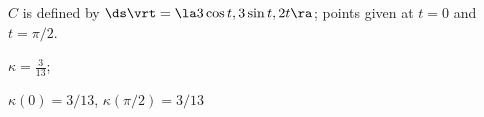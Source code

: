 {$C$ is defined by $\ds \vrt = \la 3\cos t,3\sin t, 2t\ra $; points given at $t=0$ and $t=\pi/2$. 
}
{$\kappa = \frac{3}{13}$;

$\kappa(0) = 3/13$, $\kappa(\pi/2) = 3/13$
}